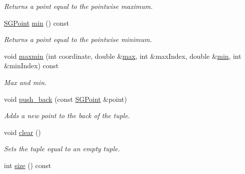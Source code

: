 \begin{DoxyCompactItemize}
\begin{DoxyCompactList}\small\item\em Returns a point equal to the pointwise maximum. \end{DoxyCompactList}\item 
\hypertarget{classSGTuple_a1ac88e2f97cefe88d1a155beab63297a}{\hyperlink{classSGPoint}{S\-G\-Point} \hyperlink{classSGTuple_a1ac88e2f97cefe88d1a155beab63297a}{min} () const }\label{classSGTuple_a1ac88e2f97cefe88d1a155beab63297a}

\begin{DoxyCompactList}\small\item\em Returns a point equal to the pointwise minimum. \end{DoxyCompactList}\item 
void \hyperlink{classSGTuple_a57c30a62e3faaaa2b8834cb1cd1b617c}{maxmin} (int coordinate, double \&\hyperlink{classSGTuple_a616801eebc023c41e305c1cde9dcfccd}{max}, int \&max\-Index, double \&\hyperlink{classSGTuple_ab413ab0a7d009f719b594aef2862f2af}{min}, int \&min\-Index) const 
\begin{DoxyCompactList}\small\item\em Max and min. \end{DoxyCompactList}\item 
\hypertarget{classSGTuple_a5aae68fc99fd77e346ee712b634fc358}{void \hyperlink{classSGTuple_a5aae68fc99fd77e346ee712b634fc358}{push\-\_\-back} (const \hyperlink{classSGPoint}{S\-G\-Point} \&point)}\label{classSGTuple_a5aae68fc99fd77e346ee712b634fc358}

\begin{DoxyCompactList}\small\item\em Adds a new point to the back of the tuple. \end{DoxyCompactList}\item 
\hypertarget{classSGTuple_a5eec252277fa0f1007ce54dec61a6cdb}{void \hyperlink{classSGTuple_a5eec252277fa0f1007ce54dec61a6cdb}{clear} ()}\label{classSGTuple_a5eec252277fa0f1007ce54dec61a6cdb}

\begin{DoxyCompactList}\small\item\em Sets the tuple equal to an empty tuple. \end{DoxyCompactList}\item 
\hypertarget{classSGTuple_a84361904d7b69dd1a4097dc7eaa7b133}{int \hyperlink{classSGTuple_a84361904d7b69dd1a4097dc7eaa7b133}{size} () const }\label{classSGTuple_a84361904d7b69dd1a4097dc7eaa7b133}


\end{DoxyCompactItemize}
